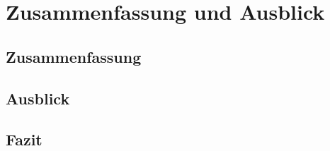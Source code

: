 \chapter{Zusammenfassung und Ausblick}
\section{Zusammenfassung}

\section{Ausblick}
\label{sec:extension}

\section{Fazit}
